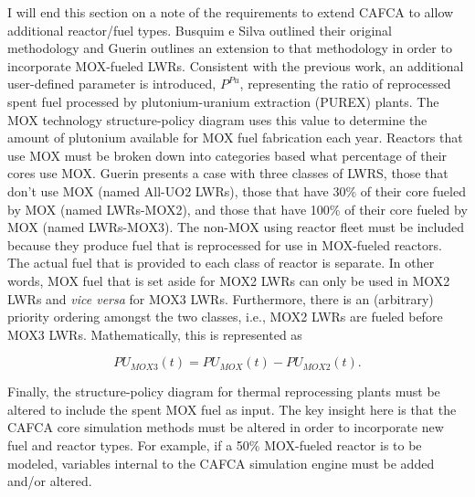 I will end this section on a note of the requirements to extend CAFCA to allow
additional reactor/fuel types. Busquim e Silva outlined their original
methodology \cite{busquim_e_silva_system_2008} and Guerin outlines an extension
to that methodology\cite{guerin_impact_2009} in order to incorporate MOX-fueled
LWRs. Consistent with the previous work, an additional user-defined parameter is
introduced, $P^{Pu}$, representing the ratio of reprocessed spent fuel processed
by plutonium-uranium extraction (PUREX) plants. The MOX technology
structure-policy diagram uses this value to determine the amount of plutonium
available for MOX fuel fabrication each year. Reactors that use MOX must be
broken down into categories based what percentage of their cores use MOX. Guerin
presents a case with three classes of LWRS, those that don't use MOX (named
All-UO2 LWRs), those that have 30\% of their core fueled by MOX (named
LWRs-MOX2), and those that have 100\% of their core fueled by MOX (named
LWRs-MOX3). The non-MOX using reactor fleet must be included because they
produce fuel that is reprocessed for use in MOX-fueled reactors. The actual fuel
that is provided to each class of reactor is separate. In other words, MOX fuel
that is set aside for MOX2 LWRs can only be used in MOX2 LWRs and \textit{vice
versa} for MOX3 LWRs. Furthermore, there is an (arbitrary) priority ordering
amongst the two classes, i.e., MOX2 LWRs are fueled before MOX3
LWRs. Mathematically, this is represented as

\begin{equation*}
PU_{MOX3}(t) = PU_{MOX}(t) - PU_{MOX2}(t).
\end{equation*}

Finally, the structure-policy diagram for thermal reprocessing plants must be
altered to include the spent MOX fuel as input. The key insight here is that the
CAFCA core simulation methods must be altered in order to incorporate new fuel
and reactor types. For example, if a 50\% MOX-fueled reactor is to be modeled,
variables internal to the CAFCA simulation engine must be added and/or altered. 
